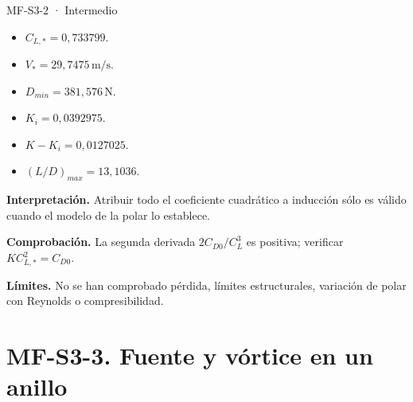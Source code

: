 \begin{studiumworked}{MF-S3-2 · Intermedio}
\begin{itemize}
\item $C_{L,*}=0{,}733799$.

\item $V_*=29{,}7475\,\mathrm{m/s}$.

\item $D_{min}=381{,}576\,\mathrm{N}$.

\item $K_i=0{,}0392975$.

\item $K-K_i=0{,}0127025$.

\item $(L/D)_{max}=13{,}1036$.

\end{itemize}

\textbf{Interpretación.} Atribuir todo el coeficiente cuadrático a inducción sólo es válido cuando el modelo de la polar lo establece.

\textbf{Comprobación.} La segunda derivada $2C_{D0}/C_L^3$ es positiva; verificar $KC_{L,*}^2=C_{D0}$.

\textbf{Límites.} No se han comprobado pérdida, límites estructurales, variación de polar con Reynolds o compresibilidad.

\end{studiumworked}

\Needspace{.30\textheight}\section{MF-S3-3. Fuente y vórtice en un anillo}

